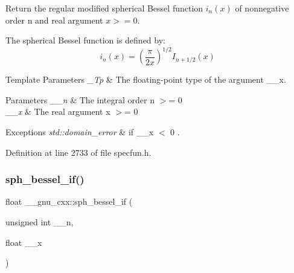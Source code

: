 Return the regular modified spherical Bessel function $ i_n(x) $ of nonnegative order n and real argument $ x >= 0 $.

The spherical Bessel function is defined by\+: \[ i_n(x) = \left(\frac{\pi}{2x} \right) ^{1/2} I_{n+1/2}(x) \]


\begin{DoxyTemplParams}{Template Parameters}
{\em \+\_\+\+Tp} & The floating-\/point type of the argument {\ttfamily \+\_\+\+\_\+x}. \\
\hline
\end{DoxyTemplParams}

\begin{DoxyParams}{Parameters}
{\em \+\_\+\+\_\+n} & The integral order {\ttfamily  n $>$= 0 } \\
\hline
{\em \+\_\+\+\_\+x} & The real argument {\ttfamily  x $>$= 0 } \\
\hline
\end{DoxyParams}

\begin{DoxyExceptions}{Exceptions}
{\em std\+::domain\+\_\+error} & if {\ttfamily  \+\_\+\+\_\+x $<$ 0 }. \\
\hline
\end{DoxyExceptions}


Definition at line 2733 of file specfun.\+h.

\mbox{\label{group__gnu__math__spec__func_gacc6738f18c1ba19452b9dd814d11c00c}} 
\subsubsection{\texorpdfstring{sph\+\_\+bessel\+\_\+if()}{sph\_bessel\_if()}}
{\footnotesize\ttfamily float \+\_\+\+\_\+gnu\+\_\+cxx\+::sph\+\_\+bessel\+\_\+if (\begin{DoxyParamCaption}\item[{unsigned int}]{\+\_\+\+\_\+n,  }\item[{float}]{\+\_\+\+\_\+x }\end{DoxyParamCaption})\hspace{0.3cm}{\ttfamily [inline]}}


